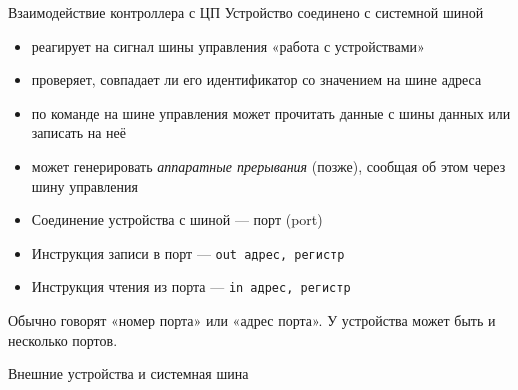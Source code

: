 \documentclass[xetex,aspectratio=43]{beamer}
\begin{document}
\begin{frame}[fragile]{Взаимодействие контроллера с ЦП}
	Устройство соединено с системной шиной

	\begin{itemize}
		\tightlist
		\item
		реагирует на сигнал шины управления «работа с устройствами»
		\item
		проверяет, совпадает ли его идентификатор со значением на шине адреса
		\item
		по команде на шине управления может прочитать данные с шины данных или записать на неё
		\item
		может генерировать \emph{аппаратные прерывания} (позже), сообщая об этом через шину управления
	\end{itemize}


	\begin{itemize}
		\tightlist
		\item
		Соединение устройства с шиной --- порт (port)
		\item
		Инструкция записи в порт --- \texttt{out\ адрес,\ регистр}
		\item
		Инструкция чтения из порта --- \texttt{in\ адрес,\ регистр}
	\end{itemize}


	Обычно говорят «номер порта» или «адрес порта». У устройства может быть
	и несколько портов.
\end{frame}

\begin{frame}{Внешние устройства и системная шина}
    \begin{figure}
    
\end{figure}
\end{frame}
\end{document}
